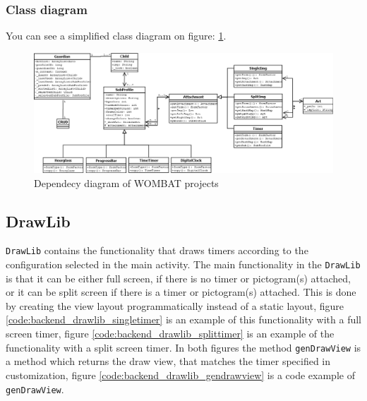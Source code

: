 \subsubsection{Class diagram}
You can see a simplified class diagram on figure: \ref{fig:classdiagram}.

\begin{figure}[H]
	\centering
		\includegraphics[scale=0.3]{Images/Implementation/classdiagram.png}
	\caption{Dependecy diagram of WOMBAT projects}
	\label{fig:classdiagram}
\end{figure}

\subsection{DrawLib}
\texttt{DrawLib} contains the functionality that draws timers according to the configuration selected in the main activity.
The main functionality in the \texttt{DrawLib} is that it can be either full screen, if there is no timer or pictogram(s) attached, or it can be split screen if there is a timer or pictogram(s) attached.
This is done by creating the view layout programmatically instead of a static layout, figure \ref{code:backend_drawlib_singletimer} is an example of this functionality with a full screen timer, figure \ref{code:backend_drawlib_splittimer} is an example of the functionality with a split screen timer.
In both figures the method \texttt{genDrawView} is a method which returns the draw view, that matches the timer specified in customization, figure \ref{code:backend_drawlib_gendrawview} is a code example of \texttt{genDrawView}.

